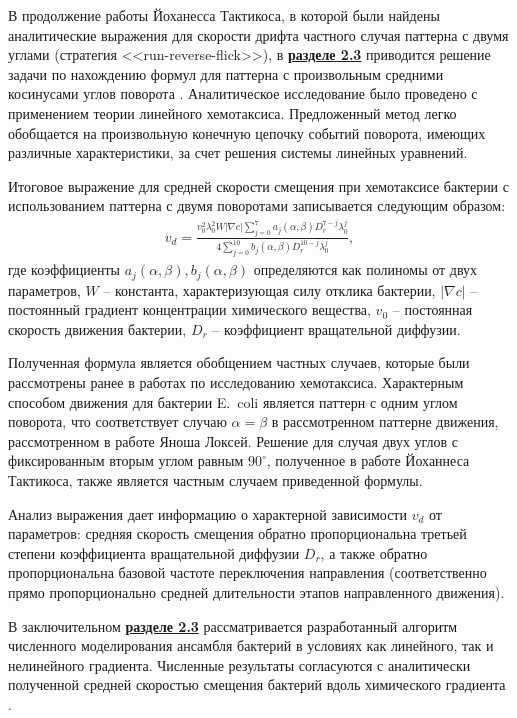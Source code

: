 В продолжение работы Йоханесса Тактикоса, в которой были найдены аналитические выражения для скорости дрифта частного случая паттерна с двумя углами (стратегия <<run-reverse-flick>>), в \underline{\textbf{разделе 2.3}} приводится решение задачи по нахождению формул для паттерна с произвольным средними косинусами углов поворота \cite{bib2}. Аналитическое исследование было проведено с применением теории линейного хемотаксиса. Предложенный метод легко обобщается на произвольную конечную цепочку событий поворота, имеющих различные характеристики, за счет решения системы линейных уравнений.

Итоговое выражение для средней скорости смещения при хемотаксисе бактерии с использованием паттерна с двумя поворотами записывается следующим образом:
\begin{equation}
    \begin{aligned}
        v_d=\frac{v_0^2\lambda_0^2W|\nabla c|\sum_{j=0}^{7} a_j(\alpha, \beta)D_r^{7-j}\lambda_0^j}{4\sum_{j=0}^{10}b_j(\alpha,\beta)D_r^{10-j}\lambda_0^j},
        \label{eq:drift-speed-solution}
    \end{aligned}
\end{equation}
где коэффициенты $a_j(\alpha,\beta), b_j(\alpha,\beta)$ определяются как полиномы от двух параметров, $W$ -- константа, характеризующая силу отклика бактерии, $|\nabla c|$ -- постоянный градиент концентрации химического вещества, $v_0$ -- постоянная скорость движения бактерии, $D_r$ -- коэффициент вращательной диффузии.

Полученная формула является обобщением частных случаев, которые были рассмотрены ранее в работах по исследованию хемотаксиса. Характерным способом движения для бактерии E.~coli является паттерн с одним углом поворота, что соответствует случаю $\alpha=\beta$ в рассмотренном паттерне движения, рассмотренном в работе Яноша Локсей. Решение для случая двух углов с фиксированным вторым углом равным $90^\circ$, полученное в работе Йоханнеса Тактикоса, также является частным случаем приведенной формулы.

Анализ выражения дает информацию о характерной зависимости $v_d$ от параметров: средняя скорость смещения обратно пропорциональна третьей степени коэффициента вращательной диффузии $D_r$, а также обратно пропорциональна базовой частоте переключения направления (соответственно прямо пропорционально средней длительности этапов направленного движения). 

В заключительном \underline{\textbf{разделе 2.3}} рассматривается разработанный алгоритм численного моделирования ансамбля бактерий в условиях как линейного, так и нелинейного градиента. Численные результаты согласуются с аналитически полученной средней скоростью смещения бактерий вдоль химического градиента \cite{confbib6}.



